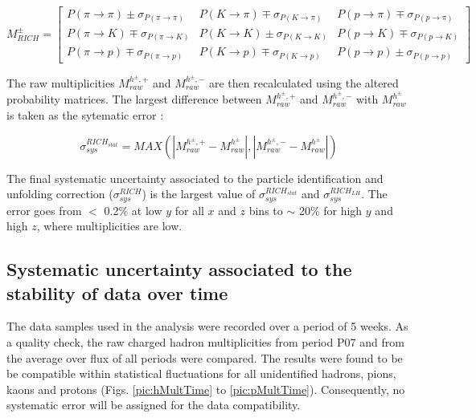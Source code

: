 \begin{equation}
  M^{\pm}_{RICH}
  =
  \begin{bmatrix}
  P(\pi \rightarrow \pi)\pm\sigma_{P(\pi \rightarrow \pi)} & P(K \rightarrow \pi)\mp\sigma_{P(K \rightarrow \pi)} & P(p \rightarrow \pi)\mp\sigma_{P(p \rightarrow \pi)}\\
  P(\pi \rightarrow K)\mp\sigma_{P(\pi \rightarrow K)} & P(K \rightarrow K)\pm\sigma_{P(K \rightarrow K)} & P(p \rightarrow K)\mp\sigma_{P(p \rightarrow K)} \\
  P(\pi \rightarrow p)\mp\sigma_{P(\pi \rightarrow p)} & P(K \rightarrow p)\mp\sigma_{P(K \rightarrow p)} & P(p \rightarrow p)\pm\sigma_{P(p \rightarrow p)}
  \end{bmatrix}
	\label{eq:StatMat}
\end{equation}

The raw multiplicities $M^{h^{\pm},+}_{raw}$ and $M^{h^{\pm},-}_{raw}$ are then recalculated using the altered probability matrices. The largest difference between
$M^{h^{\pm},+}_{raw}$ and $M^{h^{\pm},-}_{raw}$ with $M^{h^{\pm}}_{raw}$ is taken as the sytematic error :

\begin{equation}
  \sigma^{RICH_{stat}}_{sys} = MAX(|M^{h^{\pm},+}_{raw}-M^{h^{\pm}}_{raw}|,|M^{h^{\pm},-}_{raw}-M^{h^{\pm}}_{raw}|)
\end{equation}

The final systematic uncertainty associated to the particle identification and unfolding correction ($\sigma^{RICH}_{sys}$) is the largest value of $\sigma^{RICH_{stat}}_{sys}$ and $\sigma^{RICH_{LH}}_{sys}$. The error goes from $<$ 0.2\% at low $y$ for all $x$ and $z$ bins to $\sim$ 20\% for high $y$ and high $z$, where multiplicities are low.


\subsection{Systematic uncertainty associated to the stability of data over time}

The data samples used in the analysis were recorded over a period of 5 weeks. As a quality check, the raw charged hadron multiplicities from period P07 and from the average over flux of all periods were compared. The results were found to be be compatible within statistical fluctuations for all unidentified hadrons, pions, kaons and protons (Figs. \ref{pic:hMultTime} to \ref{pic:pMultTime}). Consequently, no systematic error will be assigned for the data compatibility.

